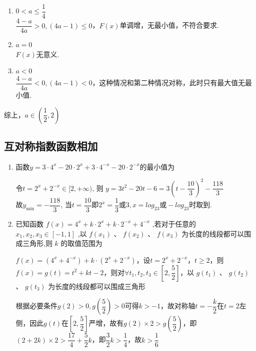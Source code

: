 \begin{enumerate}
\begin{jieda}
\begin{enumerate}
            故$2\sqrt{\dfrac{(4-a)(4a-1)}{4a}} > \sqrt{7}$，解得$a \in \left(\dfrac{1}{2}, 2\right)$ 
            \item $0 < a \leq \dfrac{1}{4}$ \\
            $\dfrac{4-a}{4a} > 0, (4a-1) \leq 0$，$F(x)$单调增，无最小值，不符合要求.
            \item $a = 0$\\
            $F(x)$无意义.
            \item $a < 0$ \\
            $\dfrac{4-a}{4a} < 0, (4a-1) < 0$，这种情况和第二种情况对称，此时只有最大值无最小值.
        \end{enumerate}
        综上，$a \in \left(\dfrac{1}{2}, 2\right)$
    \end{jieda}
    \end{enumerate}
    \subsection*{互对称指数函数相加}
    \begin{enumerate}
        \item 函数$y=3\cdot4^x-20\cdot2^x+3\cdot4^{-x}-20\cdot2^{-x}$的最小值为 
        \begin{jieda}
        令$t=2^x+2^{-x}\in[2,+\infty)$, 则
        $y = 3t^2-20t-6 = 3(t-\dfrac{10}{3})^2-\dfrac{118}{3}$ \\
        故$y_{\min}=-\dfrac{118}{3}$, 当$t=\dfrac{10}{3}$即$2^x = \dfrac{1}{3}\mbox{或}3, x=log_23 \mbox{或}-log_23$时取到. 
        \end{jieda}
        \item 已知函数 $f\left( x\right)  = {4}^{x} + k \cdot  {2}^{x} + k \cdot  {2}^{-x} + {4}^{-x}$ ,若对于任意的 ${x}_{1},{x}_{2},{x}_{3} \in  \left\lbrack  {-1,1}\right\rbrack$ ,以 $f\left( {x}_{1}\right)$ 、 $f\left( {x}_{2}\right)$ 、 $f\left( {x}_{3}\right)$ 为长度的线段都可以围成三角形,则 $k$ 的取值范围为
        \begin{jieda}
            $f\left( x\right)  = ({4}^{x} + {4}^{-x}) + k \cdot ({2}^{x} + {2}^{-x})$，设$t = {2}^{x} + {2}^{-x}$，$t \geq 2$，则$f(x) = g(t) = t^2 + kt - 2$，则对$\forall t_1, t_2, t_3 \in \left[2, \dfrac{5}{2}\right]$，以 $g\left( {t}_{1}\right)$ 、 $g\left( {t}_{2}\right)$ 、 $g\left( {t}_{3}\right)$ 为长度的线段都可以围成三角形

            根据必要条件$g(2) > 0, g\left(\dfrac{5}{2}\right) > 0$可得$k > -1$，故对称轴$t = -\dfrac{k}{2}$在$t = 2$左侧，因此$g(t)$在$\left[2, \dfrac{5}{2}\right]$严增，故有$g(2) \times 2 > g\left(\dfrac{5}{2}\right)$，即$(2+2k)\times2 > \dfrac{17}{4} + \dfrac{5}{2}k$，即$\dfrac{3}{2}k > \dfrac{1}{4}$，故$k > \dfrac{1}{6}$
        \end{jieda}
    \end{enumerate}
